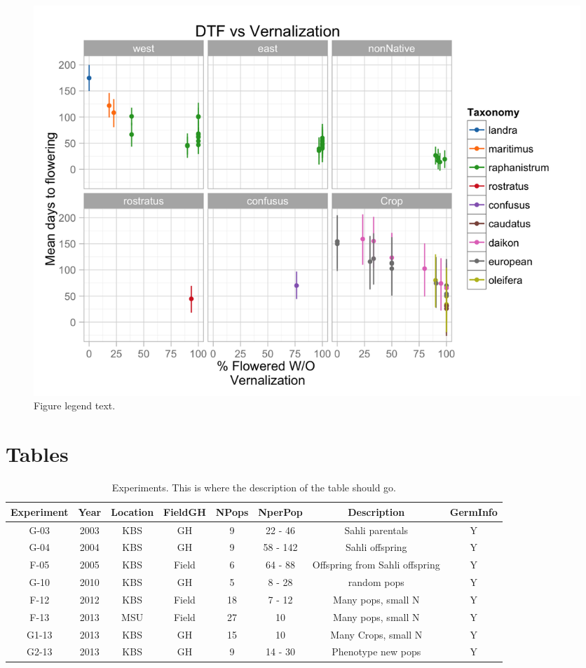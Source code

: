 \documentclass[twocolumn]{bmcart}%
\begin{document}
\begin{backmatter}
\begin{figure}[p]
  \includegraphics[width=\linewidth]{Figures/PhenotypeScatter-1.png}
  \caption{
      Figure legend text.}
      \end{figure}


      



\section*{Tables}

\begin{table}[p]
\caption{Experiments. This is where the description of the table should go.}
      \begin{tabular}{cccccccc}
        \hline
           Experiment & Year & Location & FieldGH & NPops & NperPop & Description & GermInfo\\ \hline
           G-03 & 2003 & KBS & GH & 9 & 22 - 46 & Sahli parentals & Y\\
           G-04 & 2004 & KBS & GH & 9 & 58 - 142 & Sahli offspring & Y\\
           F-05 & 2005 & KBS & Field & 6 & 64 - 88 & Offspring from Sahli offspring & Y\\
           G-10 & 2010 & KBS & GH & 5 & 8 - 28 & random pops & Y\\
           F-12 & 2012 & KBS & Field & 18 & 7 - 12 & Many pops, small N & Y\\
           F-13 & 2013 & MSU & Field & 27 & 10 & Many pops, small N & Y\\
           G1-13 & 2013 & KBS & GH & 15 & 10 & Many Crops, small N & Y\\
           G2-13 & 2013 & KBS & GH & 9 & 14 - 30 & Phenotype new pops & Y\\ \hline
      \end{tabular}
\end{table}


\end{backmatter}
\end{document}
